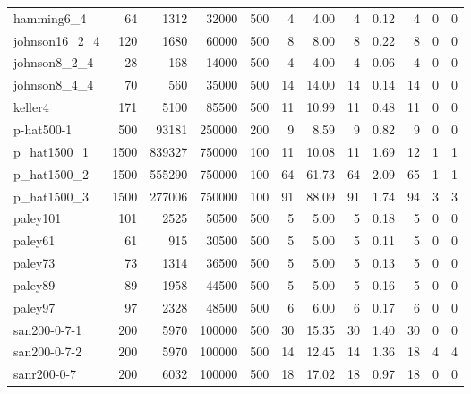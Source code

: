 \begin{tabular}{lrrrrrrrrrrr}
hamming6\_4 & 64 & 1312 & 32000 & 500 & 4 & 4.00 & 4 & 0.12 & 4 & 0 & 0 \\
johnson16\_2\_4 & 120 & 1680 & 60000 & 500 & 8 & 8.00 & 8 & 0.22 & 8 & 0 & 0 \\
johnson8\_2\_4 & 28 & 168 & 14000 & 500 & 4 & 4.00 & 4 & 0.06 & 4 & 0 & 0 \\
johnson8\_4\_4 & 70 & 560 & 35000 & 500 & 14 & 14.00 & 14 & 0.14 & 14 & 0 & 0 \\
keller4 & 171 & 5100 & 85500 & 500 & 11 & 10.99 & 11 & 0.48 & 11 & 0 & 0 \\
p-hat500-1 & 500 & 93181 & 250000 & 200 & 9 & 8.59 & 9 & 0.82 & 9 & 0 & 0 \\
p\_hat1500\_1 & 1500 & 839327 & 750000 & 100 & 11 & 10.08 & 11 & 1.69 & 12 & 1 & 1 \\
p\_hat1500\_2 & 1500 & 555290 & 750000 & 100 & 64 & 61.73 & 64 & 2.09 & 65 & 1 & 1 \\
p\_hat1500\_3 & 1500 & 277006 & 750000 & 100 & 91 & 88.09 & 91 & 1.74 & 94 & 3 & 3 \\
paley101 & 101 & 2525 & 50500 & 500 & 5 & 5.00 & 5 & 0.18 & 5 & 0 & 0 \\
paley61 & 61 & 915 & 30500 & 500 & 5 & 5.00 & 5 & 0.11 & 5 & 0 & 0 \\
paley73 & 73 & 1314 & 36500 & 500 & 5 & 5.00 & 5 & 0.13 & 5 & 0 & 0 \\
paley89 & 89 & 1958 & 44500 & 500 & 5 & 5.00 & 5 & 0.16 & 5 & 0 & 0 \\
paley97 & 97 & 2328 & 48500 & 500 & 6 & 6.00 & 6 & 0.17 & 6 & 0 & 0 \\
san200-0-7-1 & 200 & 5970 & 100000 & 500 & 30 & 15.35 & 30 & 1.40 & 30 & 0 & 0 \\
san200-0-7-2 & 200 & 5970 & 100000 & 500 & 14 & 12.45 & 14 & 1.36 & 18 & 4 & 4 \\
sanr200-0-7 & 200 & 6032 & 100000 & 500 & 18 & 17.02 & 18 & 0.97 & 18 & 0 & 0 \\
\bottomrule
\end{tabular}
